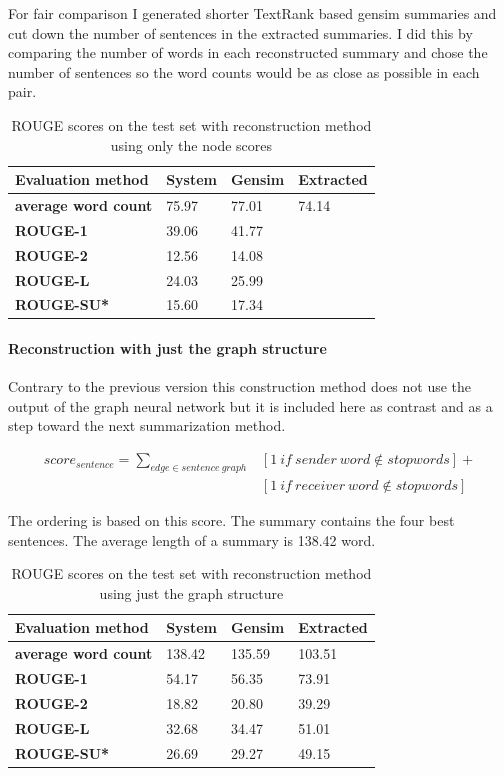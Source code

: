For fair comparison I generated shorter TextRank based gensim summaries and cut down the number of sentences in the extracted summaries. I did this by comparing the number of words in each reconstructed summary and chose the number of sentences so the word counts would be as close as possible in each pair.

\begin{table}[!ht]
	\centering
	\begin{tabular}{| l | l | l | l |}
		\hline
		\textbf{Evaluation method}&\textbf{System}&\textbf{Gensim}&\textbf{Extracted}\\ \hline \hline
		\textbf{average word count}&75.97&77.01&74.14 \\ \hline
		\textbf{ROUGE-1}&39.06&41.77& \\ \hline
		\textbf{ROUGE-2}&12.56&14.08& \\ \hline
		\textbf{ROUGE-L}&24.03&25.99& \\ \hline
		\textbf{ROUGE-SU*}&15.60&17.34& \\ \hline
	\end{tabular}
	\caption{ROUGE scores on the test set with reconstruction method using only the node scores}
\end{table}
\FloatBarrier

\paragraph{Reconstruction with just the graph structure}

Contrary to the previous version this construction method does not use the output of the graph neural network but it is included here as contrast and as a step toward the next summarization method.

\begin{eqnarray*}
	score_{sentence} = \sum_{edge \in sentence\ graph} &[1\ if\ sender\ word \notin stopwords] + \\&[1\ if\ receiver\ word \notin stopwords]
\end{eqnarray*}

The ordering is based on this score. The summary contains the four best sentences. The average length of a summary is 138.42 word.

\begin{table}[!ht]
	\centering
	\begin{tabular}{| l | l | l | l |}
		\hline
		\textbf{Evaluation method}&\textbf{System}&\textbf{Gensim}&\textbf{Extracted}\\ \hline \hline
		
		\textbf{average word count}&138.42&135.59&103.51 \\ \hline
		\textbf{ROUGE-1}&54.17&56.35&73.91 \\ \hline
		\textbf{ROUGE-2}&18.82&20.80&39.29 \\ \hline
		\textbf{ROUGE-L}&32.68&34.47&51.01 \\ \hline
		\textbf{ROUGE-SU*}&26.69&29.27&49.15 \\ \hline
	\end{tabular}
	\caption{ROUGE scores on the test set with reconstruction method using just the graph structure}
\end{table}
\FloatBarrier

